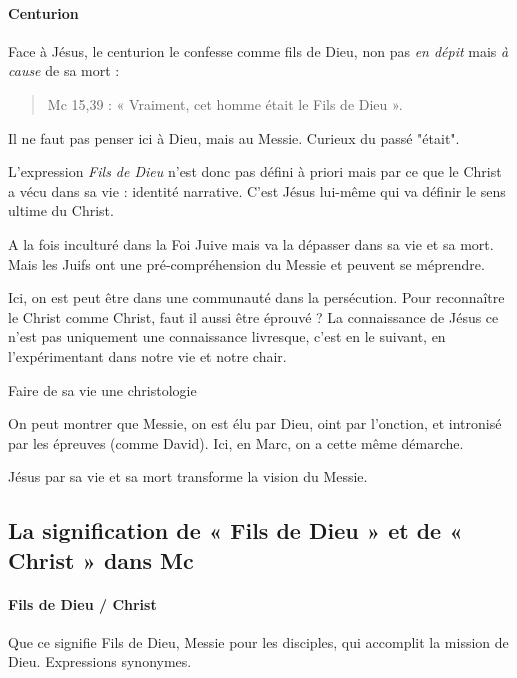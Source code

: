 \paragraph{Centurion} Face à Jésus, le centurion le confesse comme fils de Dieu, non pas \textit{en dépit} mais \textit{à cause} de sa mort : 
\begin{quote}
    Mc 15,39 : « Vraiment, cet homme était le Fils de Dieu ».
\end{quote}
Il ne faut pas penser ici à Dieu, mais au Messie. Curieux du passé "était". 



\begin{Synthesis}
L'expression \textit{Fils de Dieu} n'est donc pas défini à priori mais par ce que le Christ a vécu dans sa vie : identité narrative. C'est Jésus lui-même qui va définir le sens ultime du Christ.
\end{Synthesis}
A la fois inculturé dans la Foi Juive mais va la dépasser dans sa vie et sa mort. Mais les Juifs ont une pré-compréhension du Messie et peuvent se méprendre.

Ici, on est peut être dans une communauté dans la persécution. Pour reconnaître le Christ comme Christ, faut il aussi être éprouvé ? 
La connaissance de Jésus ce n'est pas uniquement une connaissance livresque, c'est en le suivant, en l'expérimentant dans notre vie et notre chair. 
\begin{Synthesis}
Faire de sa vie une christologie
\end{Synthesis}
      On peut montrer que Messie, on est élu par Dieu, oint par l'onction, et intronisé par les épreuves (comme David). Ici, en Marc, on a cette même démarche. 

    Jésus par sa vie et sa mort transforme la vision du Messie.
    
    
    
    
 
    \subsection{La signification de « Fils de Dieu » et de « Christ » dans Mc}
     
     
     \paragraph{Fils de Dieu / Christ } Que ce signifie Fils de Dieu,  Messie pour les disciples, qui accomplit la mission de Dieu. Expressions synonymes. 
     
